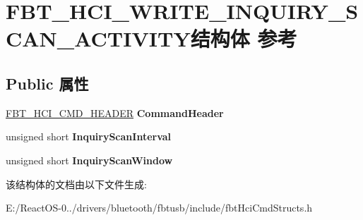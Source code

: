 \hypertarget{struct_f_b_t___h_c_i___w_r_i_t_e___i_n_q_u_i_r_y___s_c_a_n___a_c_t_i_v_i_t_y}{}\section{F\+B\+T\+\_\+\+H\+C\+I\+\_\+\+W\+R\+I\+T\+E\+\_\+\+I\+N\+Q\+U\+I\+R\+Y\+\_\+\+S\+C\+A\+N\+\_\+\+A\+C\+T\+I\+V\+I\+T\+Y结构体 参考}
\label{struct_f_b_t___h_c_i___w_r_i_t_e___i_n_q_u_i_r_y___s_c_a_n___a_c_t_i_v_i_t_y}
\subsection*{Public 属性}
\begin{DoxyCompactItemize}
\item 
\mbox{\label{struct_f_b_t___h_c_i___w_r_i_t_e___i_n_q_u_i_r_y___s_c_a_n___a_c_t_i_v_i_t_y_af19d70cf81c43e6f2f771b631f219ab1}} 
\hyperlink{struct_f_b_t___h_c_i___c_m_d___h_e_a_d_e_r}{F\+B\+T\+\_\+\+H\+C\+I\+\_\+\+C\+M\+D\+\_\+\+H\+E\+A\+D\+ER} {\bfseries Command\+Header}
\item 
\mbox{\label{struct_f_b_t___h_c_i___w_r_i_t_e___i_n_q_u_i_r_y___s_c_a_n___a_c_t_i_v_i_t_y_a9da13c1d25b1471b4c46610221c84497}} 
unsigned short {\bfseries Inquiry\+Scan\+Interval}
\item 
\mbox{\label{struct_f_b_t___h_c_i___w_r_i_t_e___i_n_q_u_i_r_y___s_c_a_n___a_c_t_i_v_i_t_y_a0dea7e4e07b06493a5d66927576c62b0}} 
unsigned short {\bfseries Inquiry\+Scan\+Window}
\end{DoxyCompactItemize}


该结构体的文档由以下文件生成\+:\begin{DoxyCompactItemize}
\item 
E\+:/\+React\+O\+S-\/0../drivers/bluetooth/fbtusb/include/fbt\+Hci\+Cmd\+Structs.\+h\end{DoxyCompactItemize}
